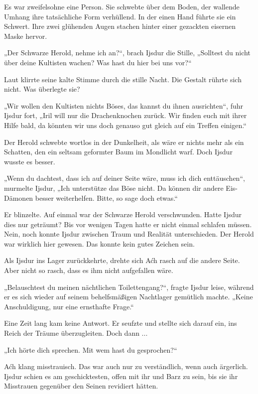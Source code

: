 Es war zweifelsohne eine Person. Sie schwebte über dem Boden, der wallende Umhang ihre tatsächliche Form verhüllend. In der einen Hand führte sie ein Schwert. Ihre zwei glühenden Augen stachen hinter einer gezackten eisernen Maske hervor.

„Der Schwarze Herold, nehme ich an?“, brach Ijsdur die Stille, „Solltest du nicht über deine Kultisten wachen? Was hast du hier bei uns vor?“

Laut klirrte seine kalte Stimme durch die stille Nacht. Die Gestalt rührte sich nicht. Was überlegte sie?

„Wir wollen den Kultisten nichts Böses, das kannst du ihnen ausrichten“, fuhr Ijsdur fort, „Iril will nur die Drachenknochen zurück. Wir finden euch mit ihrer Hilfe bald, da könnten wir uns doch genauso gut gleich auf ein Treffen einigen.“

Der Herold schwebte wortlos in der Dunkelheit, als wäre er nichts mehr als ein Schatten, den ein seltsam geformter Baum im Mondlicht warf. Doch Ijsdur wusste es besser.

„Wenn du dachtest, dass ich auf deiner Seite wäre, muss ich dich enttäuschen“, murmelte Ijsdur, „Ich unterstütze das Böse nicht. Da können dir andere Eis-Dämonen besser weiterhelfen. Bitte, so sage doch etwas.“

Er blinzelte. Auf einmal war der Schwarze Herold verschwunden. Hatte Ijsdur dies nur geträumt? Bis vor wenigen Tagen hatte er nicht einmal schlafen müssen. Nein, noch konnte Ijsdur zwischen Traum und Realität unterschieden. Der Herold war wirklich hier gewesen. Das konnte kein gutes Zeichen sein.



\trennzeichen



Als Ijsdur ins Lager zurückkehrte, drehte sich Aćh rasch auf die andere Seite. Aber nicht so rasch, dass es ihm nicht aufgefallen wäre.

„Belauschtest du meinen nächtlichen Toilettengang?“, fragte Ijsdur leise, während er es sich wieder auf seinem behelfsmäßigen Nachtlager gemütlich machte. „Keine Anschuldigung, nur eine ernsthafte Frage.“

Eine Zeit lang kam keine Antwort. Er seufzte und stellte sich darauf ein, ins Reich der Träume überzugleiten. Doch dann ...

„Ich hörte dich sprechen. Mit wem hast du gesprochen?“

Aćh klang misstrauisch. Das war auch nur zu verständlich, wenn auch ärgerlich. Ijsdur schien es am geschicktesten, offen mit ihr und Barz zu sein, bis sie ihr Misstrauen gegenüber den Seinen revidiert hätten.

